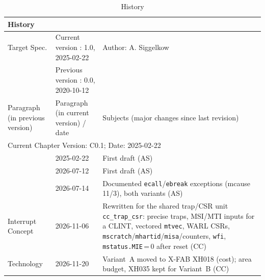 \begin{table}[H]
\caption{History}
\label{tab:product_history03}
\centering
\begin{tabularx}{\textwidth}{|X |X |X |}
  \hline
  \multicolumn{3}{|l|}{History} \\
  \hline
  \multicolumn{1}{|l}{Target Spec.} & \multicolumn{1}{l}{Current version : 1.0, 2025-02-22} & \multicolumn{1}{l|}{Author: A. Siggelkow}\\
  \multicolumn{1}{|l}{ } & \multicolumn{1}{l}{Previous version : 0.0, 2020-10-12} & \multicolumn{1}{l|}{ }\\
  \hline
  \hline
  Paragraph (in previous version) & Paragraph (in current version) / date & Subjects (major changes since last revision) \\
  \hline
  \hline
  \multicolumn{3}{|l|}{Current Chapter Version: C0.1; Date: 2025-02-22} \\
  \hline
  & 2025-02-22 & First draft (AS) \\
  \hline
  & 2026-07-12 & First draft (AS) \\
  \hline
  & 2026-07-14 & Documented \texttt{ecall}/\texttt{ebreak} exceptions (mcause 11/3), both variants (AS) \\
  \hline
  Interrupt Concept & 2026-11-06 & Rewritten for the shared trap/CSR unit \texttt{cc\_trap\_csr}:
    precise traps, MSI/MTI inputs for a CLINT, vectored \texttt{mtvec}, WARL CSRs,
    \texttt{mscratch}/\texttt{mhartid}/\texttt{misa}/counters, \texttt{wfi},
    \texttt{mstatus.MIE}\,=\,0 after reset (CC) \\
  \hline
  Technology & 2026-11-20 & Variant~A moved to X-FAB XH018 (cost); area budget, XH035 kept for Variant~B (CC) \\
  \hline
\end{tabularx}
\end{table}
